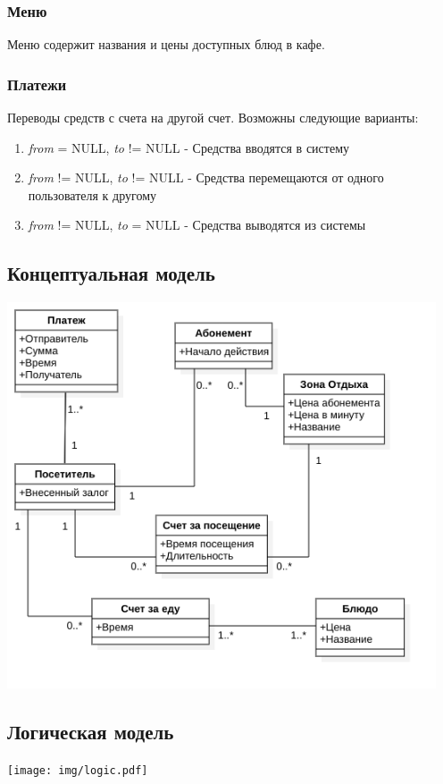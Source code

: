 \documentclass[a4paper]{article}
\begin{document}
\subsubsection{Меню}
Меню содержит названия и цены доступных блюд в кафе.

\subsubsection{Платежи}
Переводы средств с счета на другой счет. Возможны следующие варианты:

\begin{enumerate}
\item \emph{from} = NULL, \emph{to} != NULL - Средства вводятся в систему
\item \emph{from} != NULL, \emph{to} != NULL - Средства перемещаются от одного пользователя к другому
\item \emph{from} != NULL, \emph{to} = NULL - Средства выводятся из системы
\end{enumerate}

\subsection{Концептуальная модель}
\includegraphics[width=5in]{img/concept.png}
\subsection{Логическая модель}
\texttt{[image: img/logic.pdf]}
\end{document}
